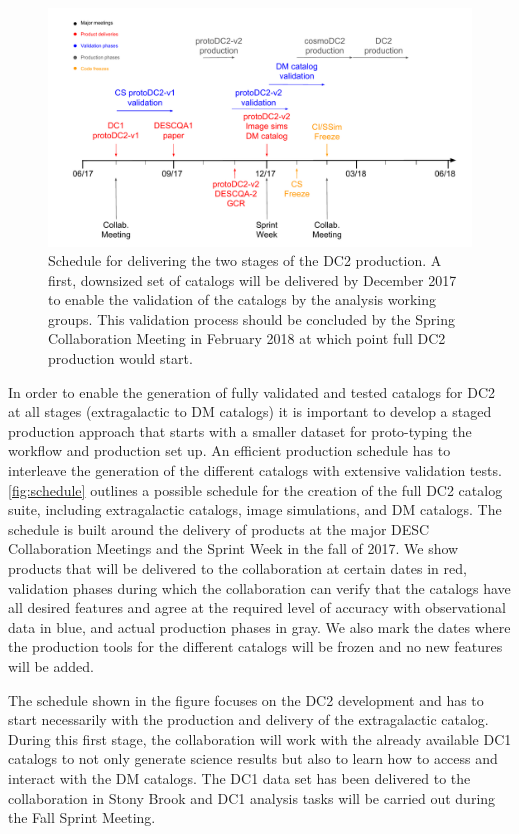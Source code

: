 \documentclass[preprint,times]{aastex61}
\begin{document}
\begin{figure}[t]
\includegraphics[width=1\textwidth]{DC2timeline}
\caption{\label{fig:schedule}Schedule for delivering the two stages of the DC2 production. A first, downsized set
of catalogs will be delivered by December 2017 to enable the validation of the catalogs by the analysis working groups. This validation process should be concluded by the Spring Collaboration Meeting in February 2018 at which point full DC2 production would start.}
\end{figure}

In order to enable the generation of fully validated and tested catalogs for DC2 at all stages (extragalactic to DM catalogs) it is important to develop a staged production approach that starts with a smaller dataset for proto-typing the workflow and production set up. An efficient production schedule has to interleave the generation of the different catalogs with extensive validation tests. \autoref{fig:schedule} outlines a possible schedule for the creation of the full DC2 catalog suite, including extragalactic catalogs, image simulations, and DM catalogs. The schedule is built around the delivery of products at the major DESC Collaboration Meetings and the Sprint Week in the fall of 2017. We show products that will be delivered to the collaboration at certain dates in red, validation phases during which the collaboration can verify that the catalogs have all desired features and agree at the required level of accuracy with observational data in blue, and actual production phases in gray. We also mark the dates where the production tools for the different catalogs will be frozen and no new features will be added.

The schedule shown in the figure focuses on the DC2 development and has to start necessarily with the production and delivery of the extragalactic catalog. During this first stage, the collaboration will work with the already available DC1 catalogs to not only generate science results but also to learn how to access and interact with the DM catalogs. The DC1 data set 
has been delivered to the collaboration in Stony Brook and DC1 analysis tasks will be carried out during the Fall Sprint Meeting.
\end{document}

